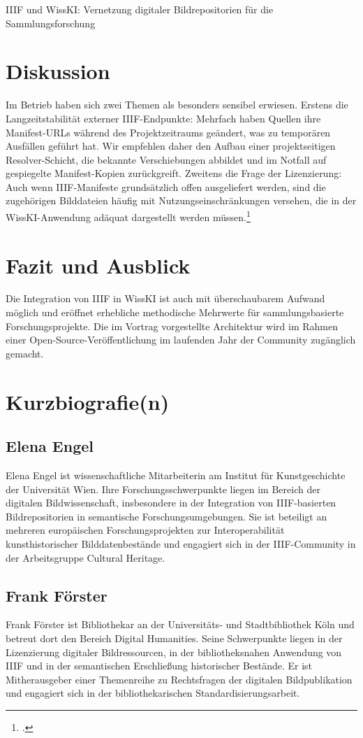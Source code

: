 \begin{beitrag}{IIIF und WissKI: Vernetzung digitaler Bildrepositorien für die Sammlungsforschung}
\section{Diskussion}
Im Betrieb haben sich zwei Themen als besonders sensibel erwiesen. Erstens die Langzeitstabilität externer IIIF-Endpunkte: Mehrfach haben Quellen ihre Manifest-URLs während des Projektzeitraums geändert, was zu temporären Ausfällen geführt hat. Wir empfehlen daher den Aufbau einer projektseitigen Resolver-Schicht, die bekannte Verschiebungen abbildet und im Notfall auf gespiegelte Manifest-Kopien zurückgreift. Zweitens die Frage der Lizenzierung: Auch wenn IIIF-Manifeste grundsätzlich offen ausgeliefert werden, sind die zugehörigen Bilddateien häufig mit Nutzungseinschränkungen versehen, die in der WissKI-Anwendung adäquat dargestellt werden müssen.\footcite[vgl.][19]{foerster2025-iiif-lizenz}

\section{Fazit und Ausblick}
Die Integration von IIIF in WissKI ist auch mit überschaubarem Aufwand möglich und eröffnet erhebliche methodische Mehrwerte für sammlungsbasierte Forschungsprojekte. Die im Vortrag vorgestellte Architektur wird im Rahmen einer Open-Source-Veröffentlichung im laufenden Jahr der Community zugänglich gemacht.

\end{beitrag}

\section*{Kurzbiografie(n)}

\subsection*{Elena Engel}
Elena Engel ist wissenschaftliche Mitarbeiterin am Institut für Kunstgeschichte der Universität Wien. Ihre Forschungsschwerpunkte liegen im Bereich der digitalen Bildwissenschaft, insbesondere in der Integration von IIIF-basierten Bildrepositorien in semantische Forschungsumgebungen. Sie ist beteiligt an mehreren europäischen Forschungsprojekten zur Interoperabilität kunsthistorischer Bilddatenbestände und engagiert sich in der IIIF-Community in der Arbeitsgruppe \glqq Cultural Heritage\grqq.

\subsection*{Frank Förster}
Frank Förster ist Bibliothekar an der Universitäts- und Stadtbibliothek Köln und betreut dort den Bereich Digital Humanities. Seine Schwerpunkte liegen in der Lizenzierung digitaler Bildressourcen, in der bibliotheksnahen Anwendung von IIIF und in der semantischen Erschließung historischer Bestände. Er ist Mitherausgeber einer Themenreihe zu Rechtsfragen der digitalen Bildpublikation und engagiert sich in der bibliothekarischen Standardisierungsarbeit.
